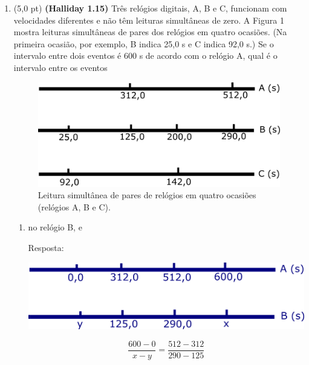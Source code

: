 \documentclass[12pt,a4paper,oneside]{article}
\begin{document}
\begin{enumerate}

	\item (5,0 pt) {\bf (Halliday 1.15)} Três relógios digitais, A, B e C, funcionam com velocidades diferentes e não têm leituras simultâneas de zero. A Figura 1 mostra leituras simultâneas de pares dos relógios em quatro ocasiões. (Na primeira ocasião, por exemplo, B indica 25,0 s e C indica 92,0 s.) Se o intervalo entre dois eventos é 600 s de acordo com o relógio A, qual é o intervalo entre os eventos 
	
	\begin{center}
		\begin{figure}[htb]
			\centering		
			\includegraphics[scale=0.4]{images/hal13.png}
			\caption{Leitura simultânea de pares de relógios em quatro ocasiões (relógios A, B e C).}
		\end{figure}
	\end{center}
	
		\begin{enumerate}
			\item no relógio B, e
			
			\vspace{0.3cm}
			
			{\color{blue} Resposta:
			
				\begin{center}
					\includegraphics[scale=0.4]{images/resp-a.png}
				\end{center}
				\vspace{0.2cm}
				
				\begin{equation}
					\dfrac{600-0}{x-y} = \dfrac{512-312}{290-125}
				\end{equation}	
				
}
\end{enumerate}
\end{enumerate}
\end{document}
